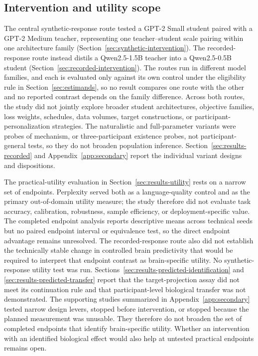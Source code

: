 \subsection{Intervention and utility scope}

The central synthetic-response route tested a GPT-2 Small student paired with a GPT-2 Medium teacher, representing one teacher--student scale pairing within one architecture family (Section~\ref{sec:synthetic-intervention}).
The recorded-response route instead distils a Qwen2.5-1.5B teacher into a Qwen2.5-0.5B student (Section~\ref{sec:recorded-intervention}).
The routes run in different model families, and each is evaluated only against its own control under the eligibility rule in Section~\ref{sec:estimands}, so no result compares one route with the other and no reported contrast depends on the family difference.
Across both routes, the study did not jointly explore broader student architectures, objective families, loss weights, schedules, data volumes, target constructions, or participant-personalization strategies.
The naturalistic and full-parameter variants were probes of mechanism, or three-participant existence probes, not participant-general tests, so they do not broaden population inference.
Section~\ref{sec:results-recorded} and Appendix~\ref{app:secondary} report the individual variant designs and dispositions.

The practical-utility evaluation in Section~\ref{sec:results-utility} rests on a narrow set of endpoints.
Perplexity served both as a language-quality control and as the primary out-of-domain utility measure; the study therefore did not evaluate task accuracy, calibration, robustness, sample efficiency, or deployment-specific value.
The completed endpoint analysis reports descriptive means across technical seeds but no paired endpoint interval or equivalence test, so the direct endpoint advantage remains unresolved.
The recorded-response route also did not establish the technically stable change in controlled brain predictivity that would be required to interpret that endpoint contrast as brain-specific utility.
No synthetic-response utility test was run.
Sections~\ref{sec:results-predicted-identification} and \ref{sec:results-predicted-transfer} report that the target-projection assay did not meet its continuation rule and that participant-level biological transfer was not demonstrated.
The supporting studies summarized in Appendix~\ref{app:secondary} tested narrow design levers, stopped before intervention, or stopped because the planned measurement was unusable.
They therefore do not broaden the set of completed endpoints that identify brain-specific utility.
Whether an intervention with an identified biological effect would also help at untested practical endpoints remains open.
